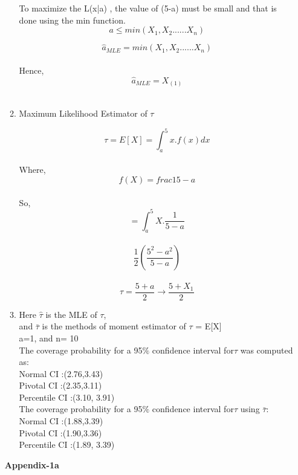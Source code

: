 \documentclass[11pt]{article}
\begin{document}
\begin{enumerate}
\begin{enumerate}
To maximize the L(x|a) , the value of (5-a) must be small and that is done using the min function.\\

$$a \leq min(X_{1},X_{2}......X_{n})$$
 
$$\hat a_{MLE} = min(X_{1},X_{2}......X_{n})$$\\

Hence,
$$\hat a_{MLE} = X_{(1)}$$\\


\item Maximum Likelihood Estimator of $\tau$

$$\tau = E[X] = \int_{a}^{5} x.f(x)dx$$\\
 Where,\\
 $$f(X) =frac{1}{5-a}$$\\
 So,
 $$= \int_{a}^{5} X. \frac{1}{5-a}$$\\
$$\dfrac{1}{2}( \dfrac{5^2-a^2}{5-a})$$\\
$$\tau =\frac{5+a}{2} \rightarrow \frac{5+X_{1}}{2}$$

\item

Here $\hat \tau$ is the MLE of $\tau$,\\
 and $\bar \tau$ is the methods of moment estimator of $\tau$ = E[X] \\
 a=1, and n= 10\footnotemark 
			 \\

 
 The coverage probability for a 95$\%$ confidence interval for$\tau$ was computed as:\\
 Normal CI :(2.76,3.43)\\
 Pivotal CI :(2.35,3.11)\\
 Percentile CI :(3.10, 3.91)\\
 
 The coverage probability for a 95$\%$ confidence interval for$\tau$ using $\bar \tau$:\\
 Normal CI :(1.88,3.39)\\
 Pivotal CI :(1.90,3.36)\\
 Percentile CI :(1.89, 3.39)\\
 
  


\end{enumerate}


\newpage
		\clearpage
		\fontsize{12}{12}
		\textbf{Appendix-1a}
		\fontsize{8}{12}
	\begin{verbatim}


\end{verbatim}
\end{enumerate}
\end{document}
